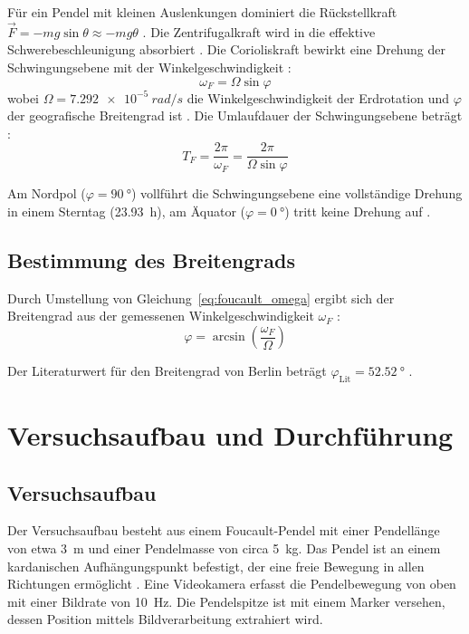 \documentclass[a4paper,12pt]{article}
\begin{document}
Für ein Pendel mit kleinen Auslenkungen dominiert die Rückstellkraft $\vec{F} = -mg\sin\theta \approx -mg\theta$ \cite[S.~89]{demtroeder2018}. Die Zentrifugalkraft wird in die effektive Schwerebeschleunigung absorbiert \cite[S.~156]{nolting2023}. Die Corioliskraft bewirkt eine Drehung der Schwingungsebene mit der Winkelgeschwindigkeit \cite[S.~157]{nolting2023}:
\begin{equation}
\omega_F = \Omega \sin\varphi
\label{eq:foucault_omega}
\end{equation}
wobei $\Omega = \qty{7.292e-5}{rad/s}$ die Winkelgeschwindigkeit der Erdrotation und $\varphi$ der geografische Breitengrad ist \cite[S.~157]{nolting2023}. Die Umlaufdauer der Schwingungsebene beträgt \cite[S.~89]{demtroeder2018}:
\begin{equation}
T_F = \frac{2\pi}{\omega_F} = \frac{2\pi}{\Omega\sin\varphi}
\label{eq:foucault_periode}
\end{equation}

Am Nordpol ($\varphi = \qty{90}{\degree}$) vollführt die Schwingungsebene eine vollständige Drehung in einem Sterntag (\qty{23.93}{h}), am Äquator ($\varphi = \qty{0}{\degree}$) tritt keine Drehung auf \cite[S.~89]{demtroeder2018}.

\subsection{Bestimmung des Breitengrads}

Durch Umstellung von Gleichung~\eqref{eq:foucault_omega} ergibt sich der Breitengrad aus der gemessenen Winkelgeschwindigkeit $\omega_F$ \cite[S.~157]{nolting2023}:
\begin{equation}
\varphi = \arcsin\left(\frac{\omega_F}{\Omega}\right)
\label{eq:breitengrad}
\end{equation}

Der Literaturwert für den Breitengrad von Berlin beträgt $\varphi_{\text{Lit}} = \qty{52.52}{\degree}$ \cite[S.~412]{demtroeder2021}.

\section{Versuchsaufbau und Durchführung}

\subsection{Versuchsaufbau}

Der Versuchsaufbau besteht aus einem Foucault-Pendel mit einer Pendellänge von etwa \qty{3}{m} und einer Pendelmasse von circa \qty{5}{kg}. Das Pendel ist an einem kardanischen Aufhängungspunkt befestigt, der eine freie Bewegung in allen Richtungen ermöglicht \cite[S.~90]{demtroeder2018}. Eine Videokamera erfasst die Pendelbewegung von oben mit einer Bildrate von \qty{10}{Hz}. Die Pendelspitze ist mit einem Marker versehen, dessen Position mittels Bildverarbeitung extrahiert wird.
\end{document}
